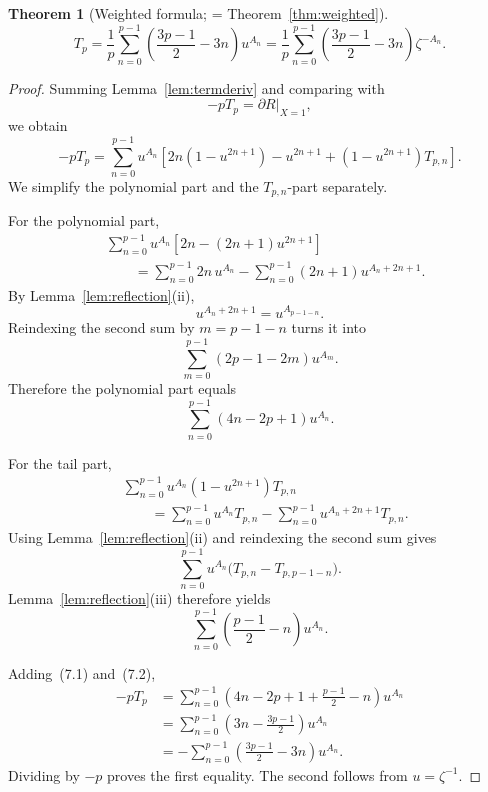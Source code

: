 \documentclass[11pt]{article}
\newtheorem{theorem}{Theorem}[section]
\theoremstyle{definition}
\begin{document}
\begin{theorem}[Weighted formula; = Theorem~\ref{thm:weighted}]\label{thm:weighted2}
\[
  T_p
  =
  \frac1p\sum_{n=0}^{p-1}
  \left(\frac{3p-1}{2}-3n\right)u^{A_n}
  =
  \frac1p\sum_{n=0}^{p-1}
  \left(\frac{3p-1}{2}-3n\right)\zeta^{-A_n}.
\]
\end{theorem}

\begin{proof}
Summing Lemma~\ref{lem:termderiv} and comparing with
\[
  -pT_p=\left.\partial R\right|_{X=1},
\]
we obtain
\begin{equation}\label{eq:master}
  -pT_p
  =
  \sum_{n=0}^{p-1}
  u^{A_n}
  \left[
    2n(1-u^{2n+1})
    -u^{2n+1}
    +(1-u^{2n+1})T_{p,n}
  \right].
\end{equation}
We simplify the polynomial part and the $T_{p,n}$-part separately.

For the polynomial part,
\[
\begin{aligned}
  &\sum_{n=0}^{p-1}
  u^{A_n}\left[2n-(2n+1)u^{2n+1}\right]\\
  &\qquad=
  \sum_{n=0}^{p-1}2n\,u^{A_n}
  -
  \sum_{n=0}^{p-1}(2n+1)u^{A_n+2n+1}.
\end{aligned}
\]
By Lemma~\ref{lem:reflection}(ii),
\[
  u^{A_n+2n+1}=u^{A_{p-1-n}}.
\]
Reindexing the second sum by $m=p-1-n$ turns it into
\[
  \sum_{m=0}^{p-1}(2p-1-2m)u^{A_m}.
\]
Therefore the polynomial part equals
\[
  \sum_{n=0}^{p-1}(4n-2p+1)u^{A_n}.
\tag{7.1}
\]

For the tail part,
\[
\begin{aligned}
  &\sum_{n=0}^{p-1}
  u^{A_n}(1-u^{2n+1})T_{p,n}\\
  &\qquad=
  \sum_{n=0}^{p-1}u^{A_n}T_{p,n}
  -
  \sum_{n=0}^{p-1}u^{A_n+2n+1}T_{p,n}.
\end{aligned}
\]
Using Lemma~\ref{lem:reflection}(ii) and reindexing the second sum gives
\[
  \sum_{n=0}^{p-1}
  u^{A_n}\bigl(T_{p,n}-T_{p,p-1-n}\bigr).
\]
Lemma~\ref{lem:reflection}(iii) therefore yields
\[
  \sum_{n=0}^{p-1}
  \left(\frac{p-1}{2}-n\right)u^{A_n}.
\tag{7.2}
\]

Adding~(7.1) and~(7.2),
\[
\begin{aligned}
  -pT_p
  &=
  \sum_{n=0}^{p-1}
  \left(
    4n-2p+1+\frac{p-1}{2}-n
  \right)u^{A_n}\\
  &=
  \sum_{n=0}^{p-1}
  \left(
    3n-\frac{3p-1}{2}
  \right)u^{A_n}\\
  &=
  -
  \sum_{n=0}^{p-1}
  \left(
    \frac{3p-1}{2}-3n
  \right)u^{A_n}.
\end{aligned}
\]
Dividing by $-p$ proves the first equality. The second follows from
$u=\zeta^{-1}$.
\end{proof}
\end{document}
